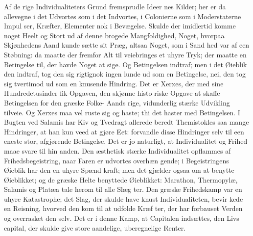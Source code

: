 \documentclass[12pt]{book}
\newcommand{\opage}[1]{\marginnote{\footnotesize\textit{[#1]}}}
\begin{document}
Af de rige Individualiteters Grund fremsprudle Ideer\-%
nes Kilder; her er da allevegne i det Udvortes som i
det Indvortes, i Colonierne som i Moderstaterne Impul\-%
ser, Kræfter, Elementer nok i Bevægelse. Skulde der
imidlertid komme noget Heelt og Stort ud af denne
brogede Mangfoldighed, Noget, hvorpaa Skjønhedens
Aand kunde sætte sit Præg, altsaa Noget, som i Sand\-%
hed var af een Støbning: da maatte der fremfor Alt til\-%
veiebringes et uhyre Tryk; der maatte en Betingelse til,
der havde Noget at sige. Og Betingelsen indtraf; men
i det Øieblik den indtraf, tog den sig rigtignok ingen\-%
lunde ud som en Betingelse, nei, den tog sig tvertimod
ud som en knusende Hindring. Det er Xerxes, der med
sine Hundredetusinder fik Opgaven, den skjønne histo\-%
riske Opgave at skaffe Betingelsen for den græske Folke-%
Aands rige, vidunderlig stærke Udvikling tilveie. Og
Xerxes maa vel ruste sig og haste; thi det haster med
Betingelsen. I Bugten ved Salamis har Kiv og Tvedragt
allerede beredt Themistokles saa mange Hindringer, at
han kun veed at gjøre Eet: forvandle disse Hindringer
selv til een eneste stor, afgjørende Betingelse. Det er jo
naturligt, at Individualitet og Frihed maae svare til hin\-%
anden. Den æsthetisk stærke Individualitet opflammes
af Frihedsbegeistring, naar Faren er udvortes overhæn\-%
gende; i Begeistringens Øieblik har den en uhyre Spænd\-%
kraft; men det gjælder ogsaa om at benytte Øieblikket;
og de græske Helte benyttede Øieblikket: Marathon,
Thermopylæ, Salamis og Platæa tale herom til alle Slæg\-%
ter. Den græske Frihedskamp var en uhyre Katastrophe;
det Slag, der skulde have knust Individualiteten, bevir\-%
\opage{26}\setcounter{footnote}{0}%
kede en Reisning, hvorved den kom til at udfolde Kræf\-%
ter, der har forbauset Verden og overrasket den selv.
Det er i denne Kamp, at Capitalen indsættes, den Livs\-%
capital, der skulde give store aandelige, uberegnelige
Renter.
\end{document}
